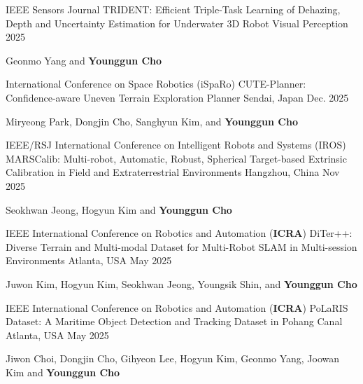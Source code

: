 \begin{cventries}
    
  \cventry
    {IEEE Sensors Journal} %
    {TRIDENT: Efficient Triple-Task Learning of Dehazing, Depth and Uncertainty Estimation for Underwater 3D Robot Visual Perception} %
    { } %
    {2025} %
    {
      \begin{cvitems} %
        \item {Geonmo Yang and \textbf{Younggun Cho}}
      \end{cvitems}
    }

  \cventry
    {International Conference on Space Robotics (iSpaRo)} %
    {CUTE-Planner: Confidence-aware Uneven Terrain Exploration Planner} %
    {Sendai, Japan} %
    {Dec. 2025} %
    {
      \begin{cvitems} %
        \item {Miryeong Park, Dongjin Cho, Sanghyun Kim, and \textbf{Younggun Cho}}
      \end{cvitems}
    }

  \cventry
    {IEEE/RSJ International Conference on Intelligent Robots and Systems (IROS)} %
    {MARSCalib: Multi-robot, Automatic, Robust, Spherical Target-based Extrinsic Calibration in Field and Extraterrestrial Environments} %
    {Hangzhou, China} %
    {Nov 2025} %
    {
      \begin{cvitems} %
        \item {Seokhwan Jeong, Hogyun Kim and \textbf{Younggun Cho}}
      \end{cvitems}
    }

  \cventry
    {IEEE International Conference on Robotics and Automation (\textbf{ICRA})} %
    {DiTer++: Diverse Terrain and Multi-modal Dataset for Multi-Robot SLAM in Multi-session Environments} %
    {Atlanta, USA} %
    {May 2025} %
    {
      \begin{cvitems} %
        \item {Juwon Kim, Hogyun Kim, Seokhwan Jeong, Youngsik Shin, and \textbf{Younggun Cho}}
      \end{cvitems}
    }


  \cventry
    {IEEE International Conference on Robotics and Automation (\textbf{ICRA})} %
    {PoLaRIS Dataset: A Maritime Object Detection and Tracking Dataset in Pohang Canal} %
    {Atlanta, USA} %
    {May 2025} %
    {
      \begin{cvitems} %
        \item {Jiwon Choi, Dongjin Cho, Gihyeon Lee, Hogyun Kim, Geonmo Yang, Joowan Kim and \textbf{Younggun Cho}}
      \end{cvitems}
    }



\end{cventries}
